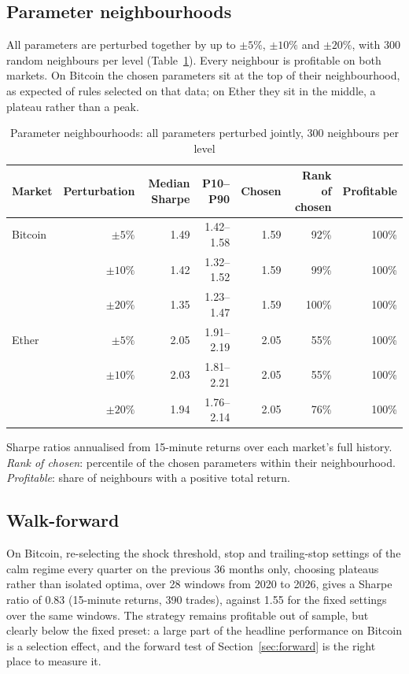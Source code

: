 \documentclass[11pt,a4paper]{article}
\newcommand{\1}{\mathbf{1}}
\begin{document}
\subsection{Parameter neighbourhoods}

All parameters are perturbed together by up to $\pm5\%$, $\pm10\%$ and $\pm20\%$, with 300 random neighbours per level (Table~\ref{tab:neigh}). Every neighbour is profitable on both markets. On Bitcoin the chosen parameters sit at the top of their neighbourhood, as expected of rules selected on that data; on Ether they sit in the middle, a plateau rather than a peak.

\begin{table}[tbp]
\centering\small
\begin{threeparttable}
\caption{Parameter neighbourhoods: all parameters perturbed jointly, 300 neighbours per level}\label{tab:neigh}
\begin{tabular}{lrrrrrr}
\toprule
Market & Perturbation & Median Sharpe & P10--P90 & Chosen & Rank of chosen & Profitable \\
\midrule
Bitcoin & $\pm5\%$ & 1.49 & 1.42--1.58 & 1.59 & 92\% & 100\% \\
 & $\pm10\%$ & 1.42 & 1.32--1.52 & 1.59 & 99\% & 100\% \\
 & $\pm20\%$ & 1.35 & 1.23--1.47 & 1.59 & 100\% & 100\% \\
Ether & $\pm5\%$ & 2.05 & 1.91--2.19 & 2.05 & 55\% & 100\% \\
 & $\pm10\%$ & 2.03 & 1.81--2.21 & 2.05 & 55\% & 100\% \\
 & $\pm20\%$ & 1.94 & 1.76--2.14 & 2.05 & 76\% & 100\% \\
\bottomrule
\end{tabular}
\begin{tablenotes}[flushleft]\footnotesize
\item Sharpe ratios annualised from 15-minute returns over each market's full history. \emph{Rank of chosen}: percentile of the chosen parameters within their neighbourhood. \emph{Profitable}: share of neighbours with a positive total return.
\end{tablenotes}
\end{threeparttable}
\end{table}

\subsection{Walk-forward}

On Bitcoin, re-selecting the shock threshold, stop and trailing-stop settings of the calm regime every quarter on the previous 36 months only, choosing plateaus rather than isolated optima, over 28 windows from 2020 to 2026, gives a Sharpe ratio of 0.83 (15-minute returns, 390 trades), against 1.55 for the fixed settings over the same windows. The strategy remains profitable out of sample, but clearly below the fixed preset: a large part of the headline performance on Bitcoin is a selection effect, and the forward test of Section~\ref{sec:forward} is the right place to measure it.
\end{document}
